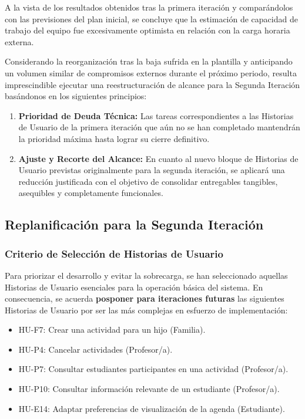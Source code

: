 A la vista de los resultados obtenidos tras la primera iteración y comparándolos con las previsiones del plan inicial, se concluye que la estimación de capacidad de trabajo del equipo fue excesivamente optimista en relación con la carga horaria externa. 

Considerando la reorganización tras la baja sufrida en la plantilla y anticipando un volumen similar de compromisos externos durante el próximo periodo, resulta imprescindible ejecutar una reestructuración de alcance para la Segunda Iteración basándonos en los siguientes principios:

\begin{enumerate}[leftmargin=1.5em, itemsep=4pt]
    \item \textbf{Prioridad de Deuda Técnica:} Las tareas correspondientes a las Historias de Usuario de la primera iteración que aún no se han completado mantendrán la prioridad máxima hasta lograr su cierre definitivo.
    \item \textbf{Ajuste y Recorte del Alcance:} En cuanto al nuevo bloque de Historias de Usuario previstas originalmente para la segunda iteración, se aplicará una reducción justificada con el objetivo de consolidar entregables tangibles, asequibles y completamente funcionales.
\end{enumerate}

\subsection{Replanificación para la Segunda Iteración}

\subsubsection{Criterio de Selección de Historias de Usuario}
Para priorizar el desarrollo y evitar la sobrecarga, se han seleccionado aquellas Historias de Usuario esenciales para la operación básica del sistema. En consecuencia, se acuerda \textbf{posponer para iteraciones futuras} las siguientes Historias de Usuario por ser las más complejas en esfuerzo de implementación:

\begin{itemize}[leftmargin=1.5em, itemsep=3pt]
    \item \textsf{HU-F7:} Crear una actividad para un hijo (Familia).
    \item \textsf{HU-P4:} Cancelar actividades (Profesor/a).
    \item \textsf{HU-P7:} Consultar estudiantes participantes en una actividad (Profesor/a).
    \item \textsf{HU-P10:} Consultar información relevante de un estudiante (Profesor/a).
    \item \textsf{HU-E14:} Adaptar preferencias de visualización de la agenda (Estudiante).
\end{itemize}

